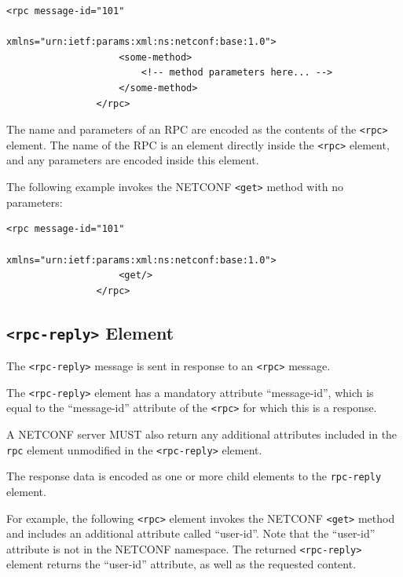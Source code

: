 \begin{lstlisting}[style=xmlStyle, caption={\texttt{<rpc>} Model.}, backgroundcolor=\color{codebackground}]
                <rpc message-id="101"
                        xmlns="urn:ietf:params:xml:ns:netconf:base:1.0">
                    <some-method>
                        <!-- method parameters here... -->
                    </some-method>
                </rpc>             
\end{lstlisting}

The name and parameters of an RPC are encoded as the contents of the \texttt{<rpc>} element. The name of the RPC is an element directly inside the \texttt{<rpc>} element, and any parameters are encoded inside this element.

The following example invokes the NETCONF \texttt{<get>} method with no parameters:

\begin{lstlisting}[style=xmlStyle, caption={\texttt{<rpc>} \texttt{<get>} Model.}, backgroundcolor=\color{codebackground}]
                <rpc message-id="101"
                        xmlns="urn:ietf:params:xml:ns:netconf:base:1.0">
                    <get/>
                </rpc>           
\end{lstlisting}




\subsection*{\texttt{<rpc-reply>} Element}


The \texttt{<rpc-reply>} message is sent in response to an \texttt{<rpc>} message.

The \texttt{<rpc-reply>} element has a mandatory attribute ``message-id'', which is equal to the ``message-id'' attribute of the \texttt{<rpc>} for which this is a response.

A NETCONF server MUST also return any additional attributes included in the \texttt{rpc} element unmodified in the \texttt{<rpc-reply>} element.

The response data is encoded as one or more child elements to the \texttt{rpc-reply} element.

For example, the following \texttt{<rpc>} element invokes the NETCONF \texttt{<get>} method and includes an additional attribute called ``user-id''.  Note that the ``user-id'' attribute is not in the NETCONF namespace.  The returned \texttt{<rpc-reply>} element returns the ``user-id'' attribute, as well as the requested content.

